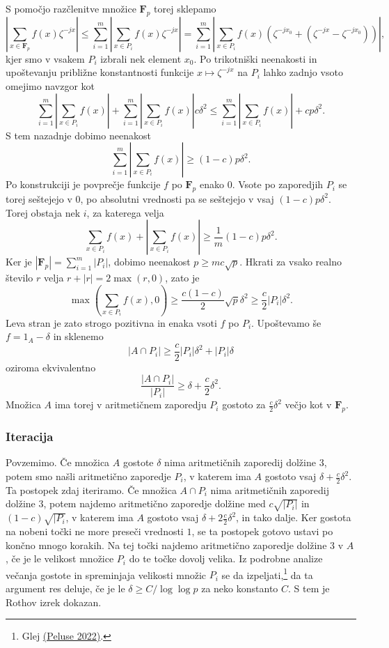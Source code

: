 \documentclass[11pt]{book}
\def\FF{\mathbf{F}}
\theoremstyle{definition}
\theoremstyle{zgled}
\theoremstyle{odprtproblem}
\theoremstyle{domacanaloga}
\theoremstyle{izrek}
\begin{document}
S pomočjo razčlenitve množice $\FF_p$ torej sklepamo
\[
   \left|\sum_{x \in \FF_p} f(x) \zeta^{-jx}\right| \leq
   \sum_{i = 1}^m \left| \sum_{x \in P_i} f(x) \zeta^{-jx} \right|
   = \sum_{i = 1}^m \left| \sum_{x \in P_i} f(x) \left( \zeta^{-jx_0} + (\zeta^{-jx} - \zeta^{-jx_0}) \right) \right|,
\]
kjer smo v vsakem $P_i$ izbrali nek element $x_0$. Po trikotniški neenakosti in upoštevanju približne konstantnosti funkcije $x \mapsto \zeta^{-jx}$ na $P_i$ lahko zadnjo vsoto omejimo navzgor kot
\[
    \sum_{i = 1}^m \left| \sum_{x \in P_i} f(x) \right| + 
    \sum_{i = 1}^m \left| \sum_{x \in P_i} f(x) \right| c \delta^2
    \leq \sum_{i = 1}^m \left| \sum_{x \in P_i} f(x) \right| + c p \delta^2.
\]
S tem nazadnje dobimo neenakost
\[
\sum_{i = 1}^m \left| \sum_{x \in P_i} f(x) \right| \geq (1-c) p \delta^2.
\]
Po konstrukciji je povprečje funkcije $f$ po $\FF_p$ enako $0$. Vsote po zaporedjih $P_i$ se torej seštejejo v $0$, po absolutni vrednosti pa se seštejejo v vsaj $(1-c) p \delta^2$. Torej obstaja nek $i$, za katerega velja
\[
    \sum_{x \in P_i} f(x)
    +
    \left| \sum_{x \in P_i} f(x) \right|
     \geq \frac{1}{m} (1-c) p \delta^2.  
\]
Ker je $|\FF_p| = \sum_{i = 1}^m |P_i|$, dobimo neenakost $p \geq m c \sqrt{p}$. Hkrati za vsako realno število $r$ velja $r + |r| = 2 \max(r, 0)$, zato je
\[
    \max \left( \sum_{x \in P_i} f(x), 0 \right) \geq
    \frac{c (1-c)}{2}  \sqrt{p} \delta^2
    \geq \frac{c}{2} |P_i| \delta^2.  
\]
Leva stran je zato strogo pozitivna in enaka vsoti $f$ po $P_i$. Upoštevamo še $f = 1_A - \delta$ in sklenemo
\[
    |A \cap P_i| \geq \frac{c}{2} |P_i| \delta^2 + |P_i| \delta
\]
oziroma ekvivalentno
\[
    \frac{|A \cap P_i|}{|P_i|} \geq \delta + \frac{c}{2} \delta^2.
\]
Množica $A$ ima torej v aritmetičnem zaporedju $P_i$ gostoto za $\frac{c}{2} \delta^2$ večjo kot v $\FF_p$.

\subsubsection{Iteracija}

Povzemimo. Če množica $A$ gostote $\delta$ nima aritmetičnih zaporedij dolžine $3$, potem smo našli aritmetično zaporedje $P_i$, v katerem ima $A$ gostoto vsaj $\delta + \frac{c}{2} \delta^2$. Ta postopek zdaj iteriramo. Če množica $A \cap P_i$ nima aritmetičnih zaporedij dolžine $3$, potem najdemo aritmetično zaporedje dolžine med $c\sqrt{|P_i|}$ in $(1-c)\sqrt{|P_i}$, v katerem ima $A$ gostoto vsaj $\delta + 2 \frac{c}{2} \delta^2$, in tako dalje. Ker gostota na nobeni točki ne more preseči vrednosti $1$, se ta postopek gotovo ustavi po končno mnogo korakih. Na tej točki najdemo aritmetično zaporedje dolžine $3$ v $A$, če je le velikost množice $P_i$ do te točke dovolj velika. Iz podrobne analize večanja gostote in spreminjaja velikosti množic $P_i$ se da izpeljati,\footnote{Glej \href{https://arxiv.org/pdf/2206.10037.pdf}{(Peluse 2022)}.} da ta argument res deluje, če je le $\delta \geq C/\log \log p$ za neko konstanto $C$. S tem je Rothov izrek dokazan.
\end{document}
